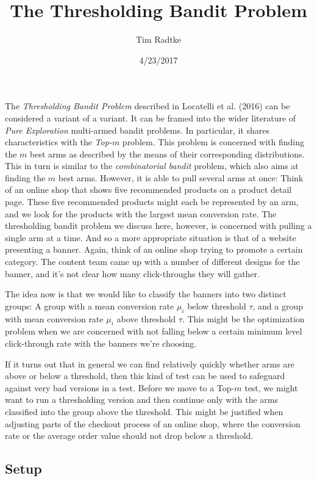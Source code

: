 \documentclass[12pt,]{article}
\title{The Thresholding Bandit Problem}
\author{Tim Radtke}
\date{4/23/2017}
\begin{document}
\maketitle

The \emph{Thresholding Bandit Problem} described in Locatelli et al.
(2016) can be considered a variant of a variant. It can be framed into
the wider literature of \emph{Pure Exploration} multi-armed bandit
problems. In particular, it shares characteristics with the
\emph{Top-\(m\)} problem. This problem is concerned with finding the
\(m\) best arms as described by the means of their corresponding
distributions. This in turn is similar to the \emph{combinatorial
bandit} problem, which also aims at finding the \(m\) best arms.
However, it is able to pull several arms at once: Think of an online
shop that shows five recommended products on a product detail page.
These five recommended products might each be represented by an arm, and
we look for the products with the largest mean conversion rate. The
thresholding bandit problem we discuss here, however, is concerned with
pulling a single arm at a time. And so a more appropriate situation is
that of a website presenting a banner. Again, think of an online shop
trying to promote a certain category. The content team came up with a
number of different designs for the banner, and it's not clear how many
click-throughs they will gather.

The idea now is that we would like to classify the banners into two
distinct groups: A group with a mean conversion rate \(\mu_i\) below
threshold \(\tau\), and a group with mean conversion rate \(\mu_i\)
above threshold \(\tau\). This might be the optimization problem when we
are concerned with not falling below a certain minimum level
click-through rate with the banners we're choosing.

If it turns out that in general we can find relatively quickly whether
arms are above or below a threshold, then this kind of test can be used
to safeguard against very bad versions in a test. Before we move to a
Top-\(m\) test, we might want to run a thresholding version and then
continue only with the arms classified into the group above the
threshold. This might be justified when adjusting parts of the checkout
process of an online shop, where the conversion rate or the average
order value should not drop below a threshold.

\subsection{Setup}\label{setup}
\end{document}
